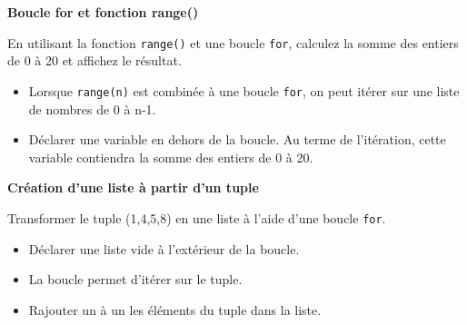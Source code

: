 	
    \begin{Exercice}[5 minutes] \textbf{Boucle for et fonction range()}
      	
      	En utilisant la fonction \lstinline{range()} et une boucle \lstinline{for}, calculez la somme des entiers de 0 à 20 et affichez le résultat.
    
        \begin{conseil}
           \begin{itemize}
           	\item Lorsque \lstinline{range(n)} est combinée à une boucle \lstinline{for}, on peut itérer sur une liste de nombres de 0 à n-1.
           	\item Déclarer une variable en dehors de la boucle. Au terme de l'itération, cette variable contiendra la somme des entiers de 0 à 20.
           \end{itemize}
		     
        \end{conseil}
        
        \begin{solution}
            
        \end{solution}
    \end{Exercice}
    
    \begin{Exercice}[10 minutes] \textbf{Création d'une liste à partir d'un tuple}
      	
      	Transformer le tuple (1,4,5,8) en une liste à l'aide d'une boucle \lstinline{for}.
    
        \begin{conseil}
           \begin{itemize}
           	\item Déclarer une liste vide à l'extérieur de la boucle.
           	\item La boucle permet d'itérer sur le tuple.
           	\item Rajouter un à un les éléments du tuple dans la liste.
           \end{itemize}
		     
        \end{conseil}
        
        \begin{solution}
            
        \end{solution}
    \end{Exercice}
    
